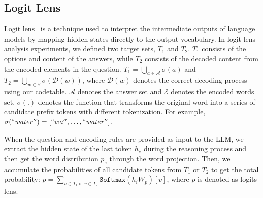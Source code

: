 \subsection{Logit Lens}


\begin{table}[h!]
\centering
\caption{Scores of models used in logit lens analysis. We tested these models using 0/3/5 words encoded dataset in the same configuration and methods of the Experiment section.}
\label{tab:scores_logit_lens}
\vskip 0.15in
\vskip -0.1in
\end{table}
Logit lens~\citep{logitlens} is a technique used to interpret the intermediate outputs of language models by mapping hidden states directly to the output vocabulary.
In logit lens analysis experiments, we defined two target sets, $T_1$ and $T_2$. 
$T_1$ consists of the options and content of the answers, while $T_2$ consists of the decoded content from the encoded elements in the question. $T_1=\bigcup\limits_{a\in \mathcal{A}} \sigma(a)$ and $T_2=\bigcup\limits_{w\in \mathcal{E}} \sigma(\mathcal{D}(w))$, where $\mathcal{D}(w)$ denotes the correct decoding process using our codetable. $\mathcal{A}$ denotes the answer set and $\mathcal{E}$ denotes the encoded words set. $\sigma(.)$ denotes the function that transforms the original word into a series of candidate prefix tokens with different tokenization. For example, $\sigma(``water'') = [``wa'', \dots, ``water'']$.

When the question and encoding rules are provided as input to the LLM, we extract the hidden state of the last token $h_{e}$ during the reasoning process and then get the word distribution $p_{e}$ through the word projection. Then, we accumulate the probabilities of all candidate tokens from $T_{1}$ or $T_{2}$ to get the total probability: $p=\sum\limits_{v\in T_{1} \ \text{or} \ v\in T_{2}}\texttt{Softmax}(h_iW_{p})[v]$, where $p$ is denoted as logits lens.

